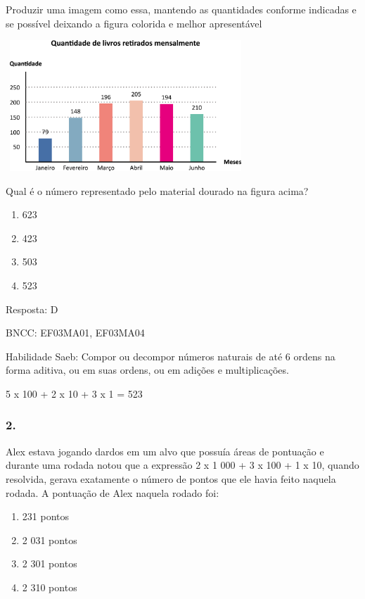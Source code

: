 Produzir uma imagem como essa, mantendo as quantidades conforme
indicadas e se possível deixando a figura colorida e melhor apresentável

\includegraphics[width=3.55128in,height=1.93600in]{media/image106.png}

Qual é o número representado pelo material dourado na figura acima?

\begin{enumerate}
\def\labelenumi{\alph{enumi})}
\item
  623
\item
  423
\item
  503
\item
  523
\end{enumerate}

Resposta: D

BNCC: EF03MA01, EF03MA04

Habilidade Saeb: Compor ou decompor números naturais de até 6 ordens na
forma aditiva, ou em suas ordens, ou em adições e multiplicações.

5 x 100 + 2 x 10 + 3 x 1 = 523

\subsubsection{2.}\label{section-127}

Alex estava jogando dardos em um alvo que possuía áreas de pontuação e
durante uma rodada notou que a expressão 2 x 1 000 + 3 x 100 + 1 x 10,
quando resolvida, gerava exatamente o número de pontos que ele havia
feito naquela rodada. A pontuação de Alex naquela rodado foi:

\begin{enumerate}
\def\labelenumi{\alph{enumi})}
\item
  231 pontos
\item
  2 031 pontos
\item
  2 301 pontos
\item
  2 310 pontos
\end{enumerate}

